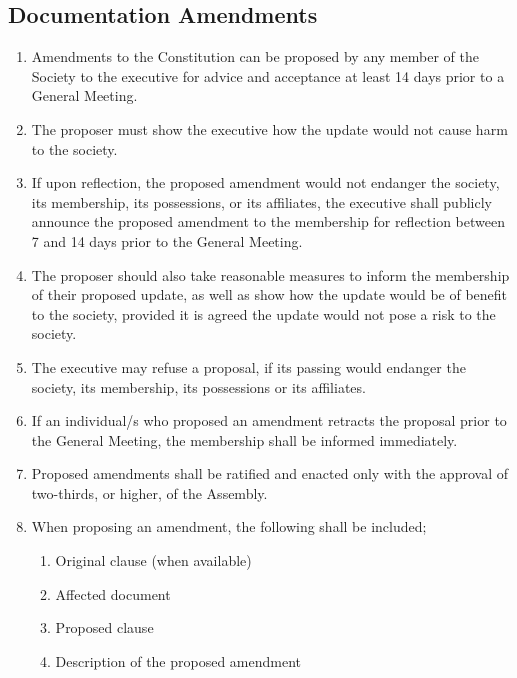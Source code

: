 \documentclass[parskip=half]{scrartcl}
\begin{document}
        \subsection{Documentation  Amendments}
            \label{gm--documentation-amendment}
            \begin{enumerate}
                \item Amendments to the Constitution can be proposed by any member of the Society to the executive for advice and acceptance at least 14 days prior to a General Meeting.
                
                \item The proposer must show the executive how the update would not cause harm to the society.
                
                \item If upon reflection, the proposed amendment would not endanger the society, its membership, its possessions, or its affiliates, the executive shall publicly announce the proposed amendment to the membership for reflection between 7 and 14 days prior to the General Meeting.
                
                \item The proposer should also take reasonable measures to inform the membership of their proposed update, as well as show how the update would be of benefit to the society, provided it is agreed the update would not pose a risk to the society. 
                \item The executive may refuse a proposal, if its passing would endanger the society, its membership, its possessions or its affiliates.
                
                \item If an individual/s who proposed an amendment retracts the proposal prior to the General Meeting, the membership shall be informed immediately.
                
                \item Proposed amendments shall be ratified and enacted only with the approval of two-thirds, or higher, of the Assembly.

                \item When proposing an amendment, the following shall be included;
                \begin{enumerate}
                    \item Original clause (when available)
                    \item Affected document
                    \item Proposed clause
                    \item Description of the proposed amendment
                \end{enumerate}
            \end{enumerate}
        
\end{document}
